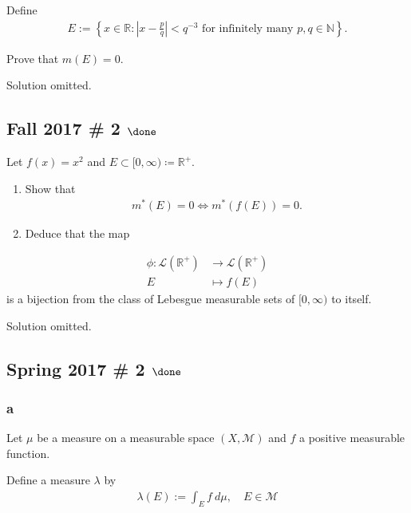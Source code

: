 Define
\begin{align*}
E:=\left\{x \in \mathbb{R}:\left|x-\frac{p}{q}\right|<q^{-3} \text { for infinitely many } p, q \in \mathbb{N}\right\}.
\end{align*}

Prove that \(m(E) = 0\).

Solution omitted.

\hypertarget{fall-2017-2-done}{%
\subsection{\texorpdfstring{Fall 2017 \# 2
\(\done\)}{Fall 2017 \# 2 \textbackslash done}}\label{fall-2017-2-done}}

Let \(f(x) = x^2\) and
\(E \subset [0, \infty) \coloneqq{\mathbb{R}}^+\).

\begin{enumerate}
\def\labelenumi{\arabic{enumi}.}
\item
  Show that
  \begin{align*}
  m^*(E) = 0 \iff m^*(f(E)) = 0.
  \end{align*}
\item
  Deduce that the map
\end{enumerate}

\begin{align*}
\phi: \mathcal{L}({\mathbb{R}}^+) &\to \mathcal{L}({\mathbb{R}}^+) \\
E &\mapsto f(E)
\end{align*}
is a bijection from the class of Lebesgue measurable sets of
\([0, \infty)\) to itself.


Solution omitted.

\hypertarget{spring-2017-2-done}{%
\subsection{\texorpdfstring{Spring 2017 \# 2
\(\done\)}{Spring 2017 \# 2 \textbackslash done}}\label{spring-2017-2-done}}

\hypertarget{a-5}{%
\subsubsection{a}\label{a-5}}

Let \(\mu\) be a measure on a measurable space \((X, \mathcal M)\) and
\(f\) a positive measurable function.

Define a measure \(\lambda\) by
\begin{align*}
\lambda(E):=\int_{E} f ~d \mu, \quad E \in \mathcal{M}
\end{align*}


